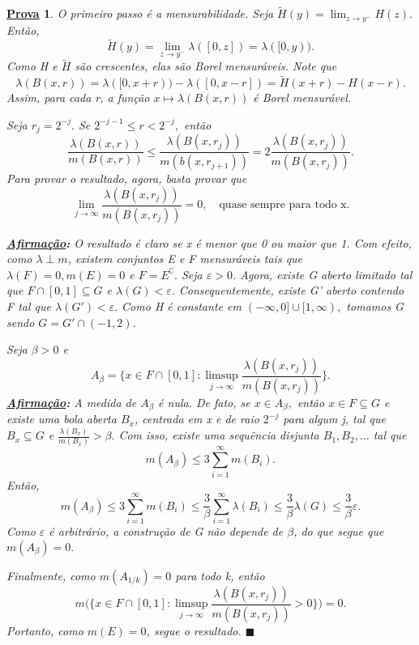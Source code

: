 \documentclass{article}
\newtheorem*{proof*}{\underline{Prova}}
\renewcommand\qedsymbol{$\blacksquare$}
\begin{document}
 \begin{proof*}
   O primeiro passo é a mensurabilidade. Seja \(\tilde{H}(y) = \lim_{z\to y^{-}}H(z).\) Então, 
     \[
       \tilde{H}(y) = \lim_{z\to y^{-}}\lambda ([0, z])=\lambda ([0, y)).
     \]
    Como H e \(\tilde{H}\) são crescentes, elas são Borel mensuráveis. Note que 
      \[
        \lambda (B(x, r)) = \lambda ([0, x + r)) - \lambda ([0, x - r]) = \tilde{H}(x+r) - H(x-r).
      \]
   Assim, para cada r, a função \(x\mapsto \lambda (B(x, r))\) é Borel mensurável.

   Seja \(r_{j} = 2^{-j}.\) Se \(2^{-j-1}\leq r < 2^{-j}, \) então 
     \[
       \frac{\lambda (B(x, r))}{m(B(x, r))} \leq \frac{\lambda (B(x, r_{j}))}{m(b(x, r_{j+1}))} = 2 \frac{\lambda (B(x, r_{j}))}{m(B(x, r_{j}))}.
     \]
    Para provar o resultado, agora, basta provar que 
      \[
        \lim_{j\to \infty}\frac{\lambda (B(x, r_{j}))}{m(B(x, r_{j}))} = 0,\quad \text{quase sempre para todo x.}
      \]

    \textbf{\underline{Afirmação}:} O resultado é claro se x é menor que 0 ou maior que 1. 
    Com efeito, como \(\lambda \perp m\), existem conjuntos E e F mensuráveis tais que \(\lambda (F) = 0, m(E) = 0\) e \(F = E ^{\complement}.\) Seja \(\varepsilon > 0\). Agora, existe G aberto limitado tal que \(F\cap [0, 1]\subseteq G\) e \(\lambda (G) < \varepsilon .\)  
    Consequentemente, existe G' aberto contendo F tal que \(\lambda (G') < \varepsilon .\) Como H é constante em \((-\infty, 0]\cup [1, \infty),\) tomamos G sendo \(G = G'\cap (-1, 2)\).

    Seja \(\beta  > 0\) e 
      \[
      A_{\beta } = \biggl\{x\in F\cap [0, 1]: \limsup_{j\to \infty}\frac{\lambda (B(x, r_{j}))}{m(B(x, r_{j}))}\biggr\}.
      \]
    \textbf{\underline{Afirmação}:} A medida de \(A_{\beta }\) é nula. De fato, se \(x\in A_{\beta },\) então \(x\in F\subseteq G\) e existe uma bola aberta \(B_{x}\), centrada em x e de raio \(2^{-j}\) para algum j, tal que \(B_{x}\subseteq G\) e \(\frac{\lambda (B_x)}{m(B_x)}>\beta .\)
Com isso, existe uma sequência disjunta \(B_1, B_2, \dotsc \) tal que 
  \[
    m(A_{\beta }) \leq 3\sum\limits_{i=1}^{\infty}m(B_{i}).
  \]
  Então, 
    \[
      m(A_{\beta }) \leq 3\sum\limits_{i=1}^{\infty}m(B_{i}) \leq \frac{3}{\beta }\sum\limits_{i=1}^{\infty}\lambda (B_{i}) \leq \frac{3}{\beta }\lambda (G) \leq \frac{3}{\beta }\varepsilon .
    \]
  Como \(\varepsilon \) é arbitrário, a construção de G não depende de \(\beta \), do que segue que \(m(A_{\beta }) = 0.\)

  Finalmente, como \(m(A_{1/k}) = 0\) para todo k, então 
    \[
      m \biggl(\biggl\{x\in F\cap [0, 1]: \limsup_{j\to \infty}\frac{\lambda (B(x, r_{j}))}{m(B(x, r_{j}))} > 0\biggr\}\biggr) = 0.
    \]
    Portanto, como \(m(E) = 0\), segue o resultado. \qedsymbol
 \end{proof*}
\end{document}
